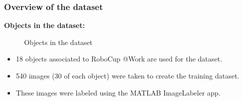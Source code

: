 \documentclass{beamer}
\begin{document}
\begin{frame}
	\frametitle{Overview of the dataset}
		\textbf{Objects in the dataset:}
		\begin{figure}
			\centering
			\hfill{}
			\hfill{}
			\hfill{}
			\hfill{}
			\hfill{}
			\caption{Objects in the dataset \cite{github_robocup@work}}
		\end{figure}

	\begin{itemize}
		\item 18 objects associated to RoboCup @Work are used for the dataset.
		\item 540 images (30 of each object) were taken to create the training dataset.
		\item These images were labeled using the MATLAB ImageLabeler app.
	\end{itemize}

\end{frame}
\end{document}
